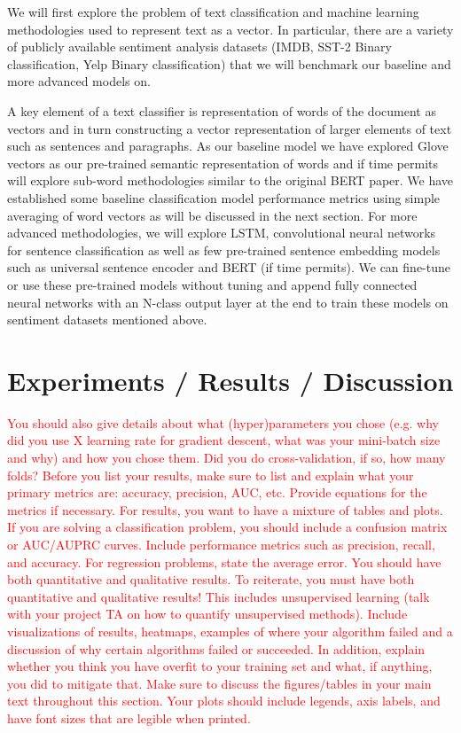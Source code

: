 \documentclass{article}
\begin{document}
We will first explore the problem of text classification and machine learning methodologies used to represent text as a vector. In particular, there are a variety of publicly available sentiment analysis datasets (IMDB, SST-2 Binary classification, Yelp Binary classification) that we will benchmark our baseline and more advanced models on. 

A key element of a text classifier is representation of words of the document as vectors and in turn constructing a vector representation of larger elements of text such as sentences and paragraphs. As our baseline model we have explored Glove vectors as our pre-trained semantic representation of words and if time permits will explore sub-word methodologies similar to the original BERT paper. We have established some baseline classification model performance metrics using simple averaging of word vectors as will be discussed in the next section. For more advanced methodologies, we will explore LSTM, convolutional neural networks for sentence classification as well as few pre-trained sentence embedding models such as universal sentence encoder and BERT (if time permits). We can fine-tune or use these pre-trained models without tuning and append fully connected neural networks with an N-class output layer at the end to train these models on sentiment datasets mentioned above.

\section{Experiments / Results / Discussion}
\textcolor{red}{
You should also give details about what (hyper)parameters you chose (e.g. why did you use X learning rate for gradient descent, what was your mini-batch size and why) and how you chose them. Did you do cross-validation, if so, how many folds? Before you list your results, make sure to list and explain what your primary metrics are: accuracy, precision, AUC, etc. Provide equations for the metrics if necessary. For results, you want to have a mixture of tables and plots. If you are solving a classification problem, you should include a confusion matrix or AUC/AUPRC curves. Include performance metrics such as precision, recall, and accuracy. For regression problems, state the average error. You should have both quantitative and qualitative results. To reiterate, you must have both quantitative and qualitative results! This includes unsupervised learning (talk with your project TA on how to quantify unsupervised methods). Include visualizations of results, heatmaps, examples of where your algorithm failed and a discussion of why certain algorithms failed or succeeded. In addition, explain whether you think you have overfit to your training set and what, if anything, you did to mitigate that. Make sure to discuss the figures/tables in your main text throughout this section. Your plots should include legends, axis labels, and have font sizes that are legible when printed.
}
\end{document}

